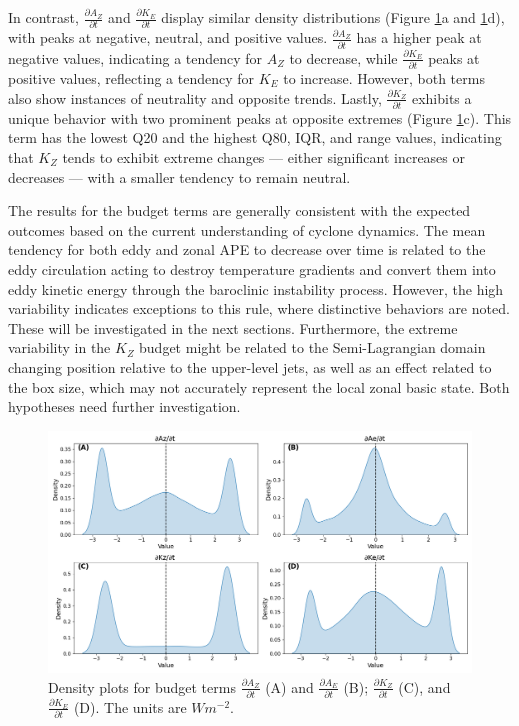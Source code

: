 In contrast, $\frac{\partial A_Z}{\partial t}$ and $\frac{\partial K_E}{\partial t}$ display similar density distributions (Figure \ref{fig:ridge_plot_Budgets_total}a and \ref{fig:ridge_plot_Budgets_total}d), with peaks at negative, neutral, and positive values. $\frac{\partial A_Z}{\partial t}$ has a higher peak at negative values, indicating a tendency for $A_Z$ to decrease, while $\frac{\partial K_E}{\partial t}$ peaks at positive values, reflecting a tendency for $K_E$ to increase. However, both terms also show instances of neutrality and opposite trends. Lastly, $\frac{\partial K_Z}{\partial t}$ exhibits a unique behavior with two prominent peaks at opposite extremes (Figure \ref{fig:ridge_plot_Budgets_total}c). This term has the lowest Q20 and the highest Q80, IQR, and range values, indicating that $K_Z$ tends to exhibit extreme changes — either significant increases or decreases — with a smaller tendency to remain neutral.  

The results for the budget terms are generally consistent with the expected outcomes based on the current understanding of cyclone dynamics. The mean tendency for both eddy and zonal APE to decrease over time is related to the eddy circulation acting to destroy temperature gradients and convert them into eddy kinetic energy through the baroclinic instability process. However, the high variability indicates exceptions to this rule, where distinctive behaviors are noted. These will be investigated in the next sections. Furthermore, the extreme variability in the $K_Z$ budget might be related to the Semi-Lagrangian domain changing position relative to the upper-level jets, as well as an effect related to the box size, which may not accurately represent the local zonal basic state. Both hypotheses need further investigation.

\begin{figure}[!htbp]
\centering
\includegraphics[width=\textwidth]{figs_5/ridge_plot_Budgets_total.png}
\caption[Density Plots - Budget Terms]{Density plots for budget terms $\frac{\partial A_Z}{\partial t}$ (A) and $\frac{\partial A_E}{\partial t}$ (B); $\frac{\partial K_Z}{\partial t}$ (C), and $\frac{\partial K_E}{\partial t}$ (D). The units are $W m^{-2}$.}
\label{fig:ridge_plot_Budgets_total}
\end{figure}

